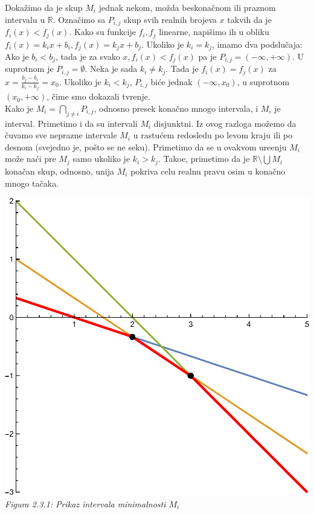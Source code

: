 \documentclass[a4paper,12pt]{article}
\numberwithin{equation}{subsection}
\begin{document}
Doka\v zimo da je skup $M_i$ jednak nekom, mo\v zda beskona\v cnom ili praznom intervalu u $\mathbb{R}$. Ozna\v cimo sa $P_{i,j}$ skup svih realnih brojeva $x$ takvih da je $f_i(x) < f_j(x)$. Kako su funkcije $f_i, f_j$ linearne, napi\v simo ih u obliku $f_i(x) = k_i x + b_i, f_j(x) = k_j x + b_j$. Ukoliko je $k_i = k_j$, imamo dva podslu\v caja: Ako je $b_i < b_j$, tada je za svako $x, f_i(x) < f_j(x)$ pa je $P_{i, j} = (-\infty, +\infty)$. U suprotnom je $P_{i,j} = \emptyset$. Neka je sada $k_i \neq k_j$. Tada je $f_i(x) = f_j(x)$ za $x = \frac{b_j-b_i}{k_i-k_j} = x_0$. Ukoliko je $k_i < k_j$, $P_{i, j}$ bi\' ce jednak $(-\infty, x_0)$, u suprotnom $(x_0, +\infty)$, \v cime smo dokazali tvr\dj enje.
\\

Kako je $M_i = \bigcap_{j \neq i} P_{i,j}$, odnosno presek kona\v cno mnogo intervala, i $M_i$ je interval. Primetimo i da su intervali $M_i$ disjunktni. Iz ovog razloga mo\v zemo da \v cuvamo sve neprazne intervale $M_i$ u rastu\' cem redosledu po levom kraju ili po desnom (svejedno je, po\v sto se ne seku). Primetimo da se u ovakvom ure\dj enju $M_i$ mo\v ze na\' ci pre $M_j$ samo ukoliko je $k_i > k_j$.  Tako\dj e, primetimo da je $\mathbb{R} \setminus \bigcup M_i$ kona\v can skup, odnosno, unija $M_i$ pokriva celu realnu pravu osim u kona\v cno mnogo ta\v caka.
\\

\begin{center}
\includegraphics[scale=0.7]{2-3-1.eps}
\\
\textit{Figura 2.3.1: Prikaz intervala minimalnosti $M_i$}
\end{center}
\end{document}
